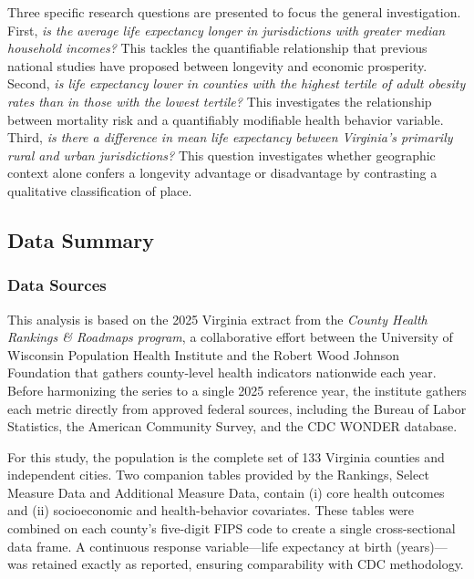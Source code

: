 \documentclass[
  12pt,
]{article}
\begin{document}
Three specific research questions are presented to focus the general
investigation. First, \emph{is the average life expectancy longer in
jurisdictions with greater median household incomes?} This tackles the
quantifiable relationship that previous national studies have proposed
between longevity and economic prosperity. Second, \emph{is life
expectancy lower in counties with the highest tertile of adult obesity
rates than in those with the lowest tertile?} This investigates the
relationship between mortality risk and a quantifiably modifiable health
behavior variable. Third, \emph{is there a difference in mean life
expectancy between Virginia's primarily rural and urban jurisdictions?}
This question investigates whether geographic context alone confers a
longevity advantage or disadvantage by contrasting a qualitative
classification of place.

\subsection{Data Summary}\label{data-summary}

\subsubsection{Data Sources}\label{data-sources}

This analysis is based on the 2025 Virginia extract from the
\emph{County Health Rankings \& Roadmaps program}, a collaborative
effort between the University of Wisconsin Population Health Institute
and the Robert Wood Johnson Foundation that gathers county-level health
indicators nationwide each year. Before harmonizing the series to a
single 2025 reference year, the institute gathers each metric directly
from approved federal sources, including the Bureau of Labor Statistics,
the American Community Survey, and the CDC WONDER database.

For this study, the population is the complete set of 133 Virginia
counties and independent cities. Two companion tables provided by the
Rankings, Select Measure Data and Additional Measure Data, contain (i)
core health outcomes and (ii) socioeconomic and health-behavior
covariates. These tables were combined on each county's five-digit FIPS
code to create a single cross-sectional data frame. A continuous
response variable---life expectancy at birth (years)---was retained
exactly as reported, ensuring comparability with CDC methodology.
\end{document}

